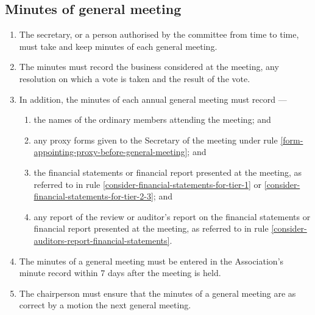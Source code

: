 \documentclass[../constitution.tex]{subfiles}
\begin{document}
\hypertarget{minutes-of-general-meeting}{%
\subsection{Minutes of general meeting}\label{minutes-of-general-meeting}}

\begin{enumerate}

\item The secretary, or a person authorised by the committee from time to time, must take and keep minutes of each general meeting.
\item The minutes must record the business considered at the meeting, any resolution on which a vote is taken and the result of the vote.
\item In addition, the minutes of each annual general meeting must record ---

  \begin{enumerate}
  
  \item the names of the ordinary members attending the meeting; and
  \item any proxy forms given to the Secretary of the meeting under rule \ref{form-appointing-proxy-before-general-meeting}; and
  \item the financial statements or financial report presented at the meeting, as referred to in rule \ref{consider-financial-statements-for-tier-1} or \ref{consider-financial-statements-for-tier-2-3}; and
  \item any report of the review or auditor's report on the financial statements or financial report presented at the meeting, as referred to in rule \ref{consider-auditors-report-financial-statements}.
  \end{enumerate}
\item The minutes of a general meeting must be entered in the Association's minute record within 7 days after the meeting is held.
\item The chairperson must ensure that the minutes of a general meeting are  as correct by a motion  the next general meeting.



\end{enumerate}
\end{document}

